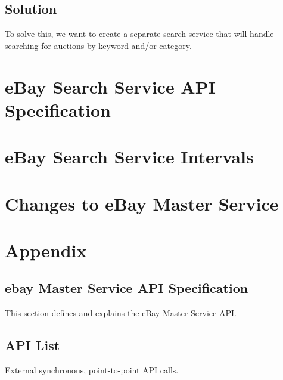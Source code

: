 \documentclass[12pt,a4paper]{article}
\begin{document}
\subsection{Solution}

To solve this, we want to create a separate search service that will handle searching for auctions by keyword and/or category.



\section{eBay Search Service API Specification}

\section{eBay Search Service Intervals}

\section{Changes to eBay Master Service}

\section{Appendix}

\subsection{ebay Master Service API Specification}
This section defines and explains the eBay Master Service API.


\subsection{API List}
External synchronous, point-to-point API calls.
\end{document}
